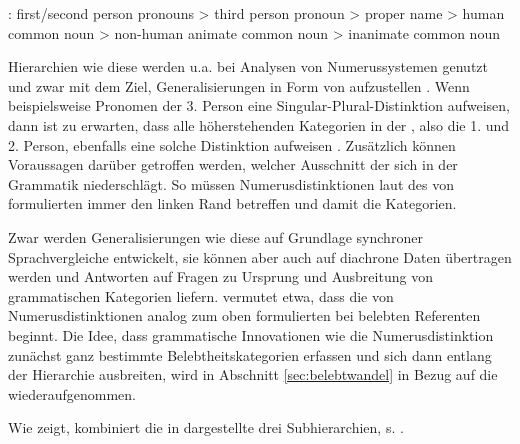 \begin{exe}
	\ex \label{ex:dixon} : first/second person pronouns > third person pronoun > proper name > human common noun > non-human animate common noun > inanimate common noun
	\end{exe}
\noindent
Hierarchien  wie diese werden u.a. bei Analysen von Numerussystemen  genutzt \parencite{Corbett2000,Croft2006} und zwar mit dem Ziel, Generalisierungen in Form von  \parencite[2]{Zifonun2006} aufzustellen \parencite[vgl. auch][47]{Dahl1996}. Wenn beispielsweise Pronomen   der 3. Person eine Singular-Plural-Distinktion  aufweisen, dann ist zu erwarten, dass alle höherstehenden Kategorien in der , also die 1. und 2. Person, ebenfalls eine solche Distinktion aufweisen \parencite[129]{Croft2006}. Zusätzlich können Voraussagen darüber getroffen werden, welcher Ausschnitt der   sich in der Grammatik niederschlägt. So müssen Numerusdistinktionen  laut des von \textcite[56]{Corbett2000} formulierten  immer den linken Rand betreffen und damit die  Kategorien. 

Zwar werden Generalisierungen wie diese auf Grundlage synchroner Sprachvergleiche entwickelt, sie können aber auch auf diachrone Daten übertragen werden und Antworten auf Fragen zu Ursprung und Ausbreitung von grammatischen Kategorien liefern. \textcite[265--267]{Corbett2000} vermutet etwa, dass die  von Numerusdistinktionen   analog zum oben formulierten  bei belebten  Referenten beginnt. Die Idee, dass grammatische Innovationen wie die Numerusdistinktion  zunächst ganz bestimmte Belebtheitskategorien  erfassen und sich dann entlang der Hierarchie  ausbreiten, wird in Abschnitt \ref{sec:belebtwandel} in Bezug auf die  wiederaufgenommen. 

Wie \textcite[130]{Croft2006} zeigt, kombiniert die in  dargestellte   drei Subhierarchien, s. .

